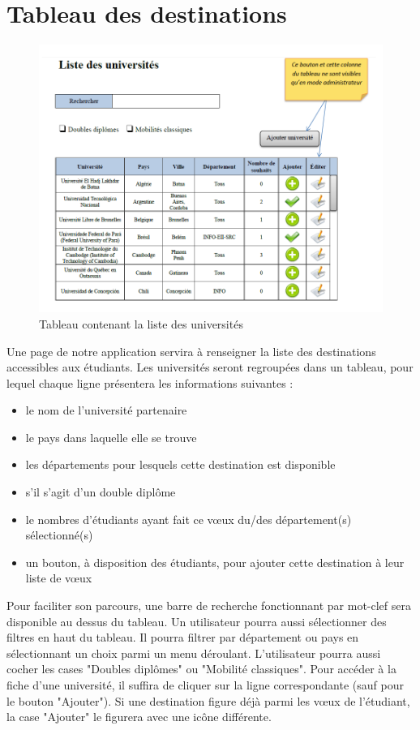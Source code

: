 \section{Tableau des destinations}
\label{sec::list_univ}

\begin{figure}[H]
	\includegraphics[scale=0.7]{Universites/listeUnivs.png}
	\caption{Tableau contenant la liste des universités}
\end{figure}

\newpage

Une page de notre application servira à renseigner la liste des destinations accessibles aux étudiants.
Les universités seront regroupées dans un tableau, pour lequel chaque ligne présentera les informations suivantes :
 \begin{itemize}
 	\item le nom de l'université partenaire
 	\item le pays dans laquelle elle se trouve
 	\item les départements pour lesquels cette destination est disponible
 	\item s'il s'agit d'un double diplôme
 	\item le nombres d'étudiants ayant fait ce vœux du/des département(s) sélectionné(s)
 	\item un bouton, à disposition des étudiants, pour ajouter cette destination à leur liste de vœux
 \end{itemize}
 
  Pour faciliter son parcours, une barre de recherche fonctionnant par mot-clef sera disponible au dessus du tableau. Un utilisateur pourra aussi sélectionner des filtres en haut du tableau. Il pourra filtrer par département ou pays en sélectionnant un choix parmi un menu déroulant. L'utilisateur pourra aussi cocher les cases "Doubles diplômes" ou "Mobilité classiques". Pour accéder à la fiche d'une université, il suffira de cliquer sur la ligne correspondante (sauf pour le bouton "Ajouter"). Si une destination figure déjà parmi les vœux de l'étudiant, la case "Ajouter" le figurera avec une icône différente.
  
